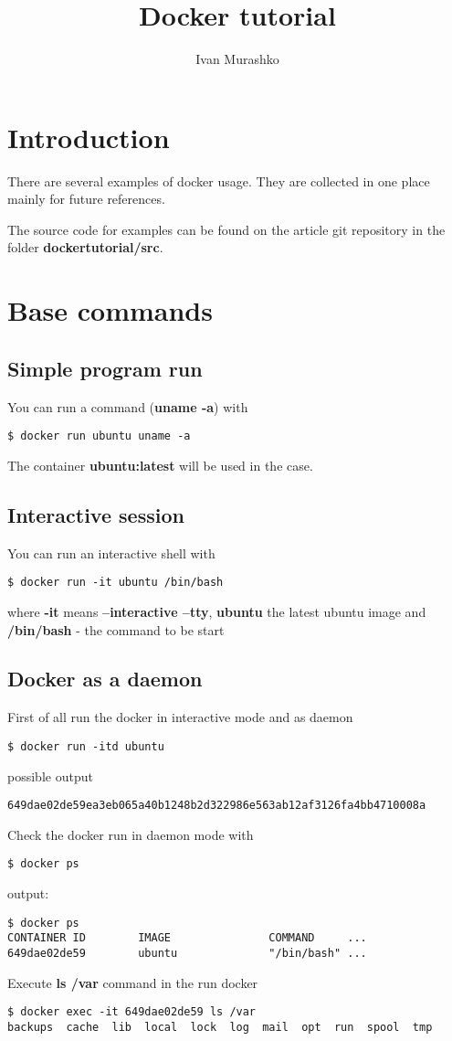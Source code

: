 \documentclass[14pt,a4paper]{article}
\title{Docker tutorial}
\author{Ivan Murashko}
\date{}
\begin{document}
\maketitle
\tableofcontents

\section*{Introduction}
There are several examples of docker usage. They are collected in one
place mainly for future references.

The source code for examples can be found on the article git
repository \cite{github:articles_ivanmurashko} in the folder 
\textbf{dockertutorial/src}.

\section{Base commands}

\subsection{Simple program run}
You can run a command (\textbf{uname -a}) with 
\begin{verbatim}
$ docker run ubuntu uname -a
\end{verbatim}
The container \textbf{ubuntu:latest} will be used in the case.

\subsection{Interactive session}
You can run an interactive shell with
\begin{verbatim}
$ docker run -it ubuntu /bin/bash
\end{verbatim}
where \textbf{-it} means \textbf{--interactive --tty}, 
\textbf{ubuntu} the latest ubuntu image and \textbf{/bin/bash} - the
command to be start 

\subsection{Docker as a daemon}
First of all run the docker in interactive mode and as daemon
\begin{verbatim}
$ docker run -itd ubuntu
\end{verbatim}
possible output
\begin{verbatim}
649dae02de59ea3eb065a40b1248b2d322986e563ab12af3126fa4bb4710008a
\end{verbatim}
Check the docker run in daemon mode with
\begin{verbatim}
$ docker ps
\end{verbatim}
output:
\begin{verbatim}
$ docker ps 
CONTAINER ID        IMAGE               COMMAND     ...
649dae02de59        ubuntu              "/bin/bash" ...
\end{verbatim}
Execute \textbf{ls /var} command in the run docker
\begin{verbatim}
$ docker exec -it 649dae02de59 ls /var
backups  cache  lib  local  lock  log  mail  opt  run  spool  tmp
\end{verbatim}

  
     
\end{document}
